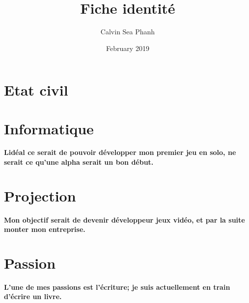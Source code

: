 \documentclass{article}
\title{Fiche identité}
\author{Calvin Sea Phanh}
\date{February 2019}
\begin{document}
\maketitle

\section{Etat civil}



\section{Informatique}

\paragraph{Lidéal ce serait de pouvoir développer mon premier jeu en solo, ne serait ce qu'une alpha serait un bon début.}

\section{Projection}

\paragraph{Mon objectif serait de devenir développeur jeux vidéo, et par la suite monter mon entreprise.}

\section{Passion}

\paragraph{L'une de mes passions est l'écriture; je suis actuellement en train d'écrire un livre.}
\end{document}

